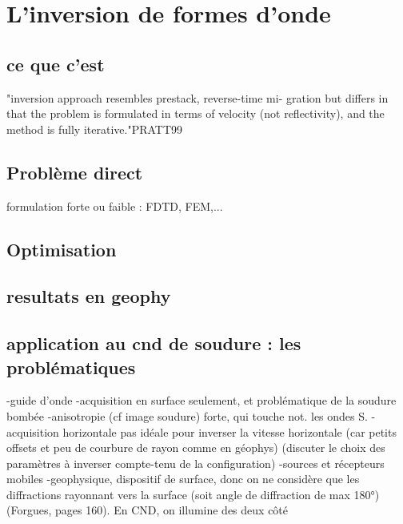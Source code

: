 \chapter{L'inversion de formes d'onde}

\section{ce que c'est}
"inversion approach resembles prestack, reverse-time mi-
gration but differs in that the problem is formulated in
terms of velocity (not reflectivity), and the method is
fully iterative."PRATT99



\section{Problème direct}
formulation forte ou faible : 
FDTD, FEM,...

\section{Optimisation}


\section{resultats en geophy}

\section{application au cnd de soudure : les problématiques}

-guide d'onde
-acquisition en surface seulement, et problématique de la soudure bombée
-anisotropie (cf image soudure) forte, qui touche not. les ondes S.
-acquisition horizontale pas idéale pour inverser la vitesse horizontale (car petits offsets et peu de courbure de rayon comme en géophys) (discuter le choix des paramètres à inverser compte-tenu de la configuration)
-sources et récepteurs mobiles 
-geophysique, dispositif de surface, donc on ne considère que les diffractions rayonnant vers la surface (soit angle de diffraction de max 180°)(Forgues, pages 160). En CND, on illumine des deux côté


